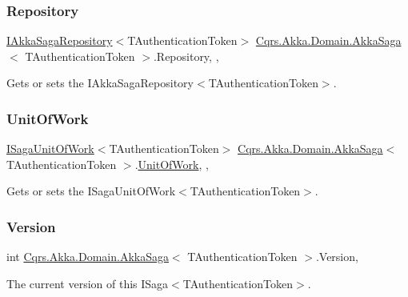\subsubsection{\texorpdfstring{Repository}{Repository}}
{\footnotesize\ttfamily \hyperlink{interfaceCqrs_1_1Akka_1_1Domain_1_1IAkkaSagaRepository}{I\+Akka\+Saga\+Repository}$<$T\+Authentication\+Token$>$ \hyperlink{classCqrs_1_1Akka_1_1Domain_1_1AkkaSaga}{Cqrs.\+Akka.\+Domain.\+Akka\+Saga}$<$ T\+Authentication\+Token $>$.Repository\hspace{0.3cm}{\ttfamily [get]}, {\ttfamily [set]}, {\ttfamily [protected]}}



Gets or sets the I\+Akka\+Saga\+Repository$<$\+T\+Authentication\+Token$>$. 

\mbox{\label{classCqrs_1_1Akka_1_1Domain_1_1AkkaSaga_addbf93da18d577da8f8f1e2dba5cafb9_addbf93da18d577da8f8f1e2dba5cafb9}} 
\subsubsection{\texorpdfstring{Unit\+Of\+Work}{UnitOfWork}}
{\footnotesize\ttfamily \hyperlink{interfaceCqrs_1_1Domain_1_1ISagaUnitOfWork}{I\+Saga\+Unit\+Of\+Work}$<$T\+Authentication\+Token$>$ \hyperlink{classCqrs_1_1Akka_1_1Domain_1_1AkkaSaga}{Cqrs.\+Akka.\+Domain.\+Akka\+Saga}$<$ T\+Authentication\+Token $>$.\hyperlink{classCqrs_1_1Domain_1_1UnitOfWork}{Unit\+Of\+Work}\hspace{0.3cm}{\ttfamily [get]}, {\ttfamily [set]}, {\ttfamily [protected]}}



Gets or sets the I\+Saga\+Unit\+Of\+Work$<$\+T\+Authentication\+Token$>$. 

\mbox{\label{classCqrs_1_1Akka_1_1Domain_1_1AkkaSaga_a3fda31a3857e12a1aed60f4a4f04edd1_a3fda31a3857e12a1aed60f4a4f04edd1}} 
\subsubsection{\texorpdfstring{Version}{Version}}
{\footnotesize\ttfamily int \hyperlink{classCqrs_1_1Akka_1_1Domain_1_1AkkaSaga}{Cqrs.\+Akka.\+Domain.\+Akka\+Saga}$<$ T\+Authentication\+Token $>$.Version\hspace{0.3cm}{\ttfamily [get]}, {}}



The current version of this I\+Saga$<$\+T\+Authentication\+Token$>$. 


